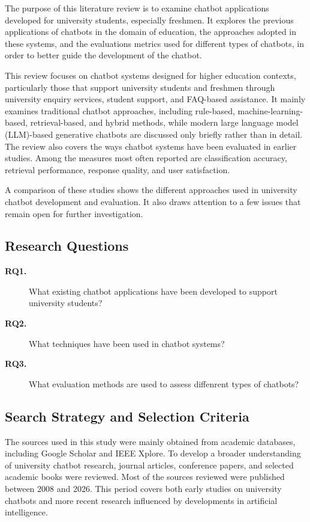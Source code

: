 \documentclass[12pt,a4paper]{article}
\begin{document}
The purpose of this literature review is to examine chatbot applications developed for university students, especially freshmen. It explores the previous applications of chatbots in the domain of education, the approaches adopted in these systems, and the evaluations metrics used for different types of chatbots, in order to better guide the development of the chatbot.

This review focuses on chatbot systems designed for higher education contexts, particularly those that support university students and freshmen through university enquiry services, student support, and FAQ-based assistance. It mainly examines traditional chatbot approaches, including rule-based, machine-learning-based, retrieval-based, and hybrid methods, while modern large language model (LLM)-based generative chatbots are discussed only briefly rather than in detail. The review also covers the ways chatbot systems have been evaluated in earlier studies. Among the measures most often reported are classification accuracy, retrieval performance, response quality, and user satisfaction.

A comparison of these studies shows the different approaches used in university chatbot development and evaluation. It also draws attention to a few issues that remain open for further investigation.

\subsection{Research Questions}

\begin{description}
    \item[\textbf{RQ1.}] What existing chatbot applications have been developed to support university students?
    \item[\textbf{RQ2.}] What techniques have been used in chatbot systems?
    \item[\textbf{RQ3.}] What evaluation methods are used to assess diffenrent types of chatbots?
\end{description}

\subsection{Search Strategy and Selection Criteria}

The sources used in this study were mainly obtained from academic databases, including Google Scholar and IEEE Xplore. To develop a broader understanding of university chatbot research, journal articles, conference papers, and selected academic books were reviewed. Most of the sources reviewed were published between 2008 and 2026. This period covers both early studies on university chatbots and more recent research influenced by developments in artificial intelligence.
\end{document}
